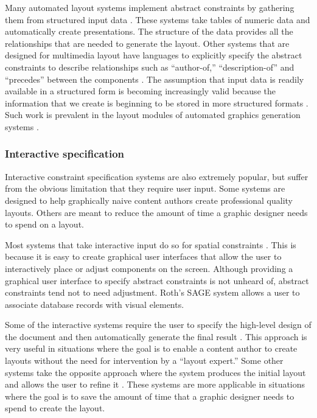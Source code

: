 		Many automated layout systems implement abstract constraints by gathering
		them from structured input data
		\citep{mackinlay-1,casner-1,borning-1,beach-1}. These systems take tables
		of numeric data and automatically create presentations. The structure of
		the data provides all the relationships that are needed to generate the
		layout. Other systems that are designed for multimedia layout have
		languages to explicitly specify the abstract constraints to describe
		relationships such as “author-of,” “description-of” and “precedes” between
		the components \citep{weitzman-2,graf-1}. The assumption that input data is
		readily available in a structured form is becoming increasingly valid
		because the information that we create is beginning to be stored in more
		structured formats \citep{bray-1}. Such work is prevalent in the layout
		modules of automated graphics generation systems \citep{zhou-2}.

    \subsubsection{Interactive specification}

		Interactive constraint specification systems are also extremely popular,
		but suffer from the obvious limitation that they require user input. Some
		systems are designed to help graphically naive content authors create
		professional quality layouts. Others are meant to reduce the amount of time
		a graphic designer needs to spend on a layout.

		Most systems that take interactive input do so for spatial constraints
		\citep{singh-2,hudson-2,borning-1}. This is because it is easy to create
		graphical user interfaces that allow the user to interactively place or
		adjust components on the screen. Although providing a graphical user
		interface to specify abstract constraints is not unheard of, abstract
		constraints tend not to need adjustment. Roth’s SAGE system \citep{roth-1}
		allows a user to associate database records with visual elements.

		Some of the interactive systems require the user to specify the high-level
		design of the document and then automatically generate the final result
		\citep{kim-1}. This approach is very useful in situations where the goal is
		to enable a content author to create layouts without the need for
		intervention by a “layout expert.” Some other systems take the opposite
		approach where the system produces the initial layout and allows the user
		to refine it \citep{singh-1}. These systems are more applicable in
		situations where the goal is to save the amount of time that a graphic
		designer needs to spend to create the layout.

